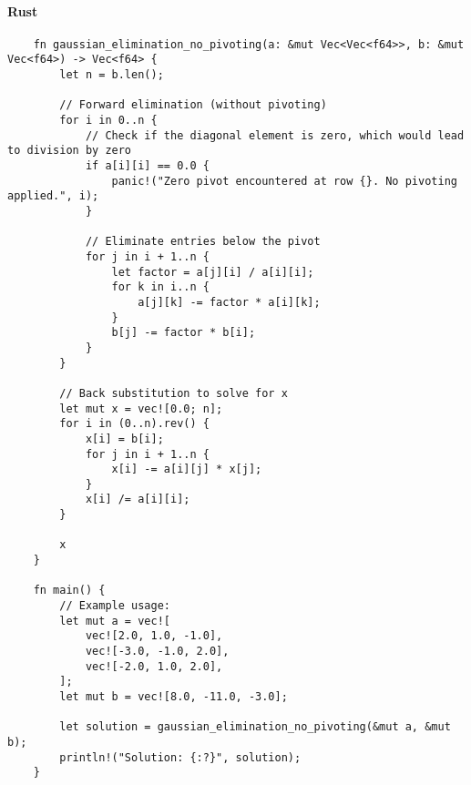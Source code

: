 \documentclass{article}
\begin{document}
            \paragraph{Rust}
                \begin{verbatim}
    fn gaussian_elimination_no_pivoting(a: &mut Vec<Vec<f64>>, b: &mut Vec<f64>) -> Vec<f64> {
        let n = b.len();

        // Forward elimination (without pivoting)
        for i in 0..n {
            // Check if the diagonal element is zero, which would lead to division by zero
            if a[i][i] == 0.0 {
                panic!("Zero pivot encountered at row {}. No pivoting applied.", i);
            }

            // Eliminate entries below the pivot
            for j in i + 1..n {
                let factor = a[j][i] / a[i][i];
                for k in i..n {
                    a[j][k] -= factor * a[i][k];
                }
                b[j] -= factor * b[i];
            }
        }

        // Back substitution to solve for x
        let mut x = vec![0.0; n];
        for i in (0..n).rev() {
            x[i] = b[i];
            for j in i + 1..n {
                x[i] -= a[i][j] * x[j];
            }
            x[i] /= a[i][i];
        }

        x
    }

    fn main() {
        // Example usage:
        let mut a = vec![
            vec![2.0, 1.0, -1.0],
            vec![-3.0, -1.0, 2.0],
            vec![-2.0, 1.0, 2.0],
        ];
        let mut b = vec![8.0, -11.0, -3.0];

        let solution = gaussian_elimination_no_pivoting(&mut a, &mut b);
        println!("Solution: {:?}", solution);
    }

                \end{verbatim}
\end{document}
